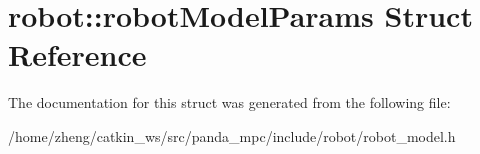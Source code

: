 \hypertarget{structrobot_1_1robot_model_params}{}\section{robot\+:\+:robot\+Model\+Params Struct Reference}
\label{structrobot_1_1robot_model_params}


The documentation for this struct was generated from the following file\+:\begin{DoxyCompactItemize}
\item 
/home/zheng/catkin\+\_\+ws/src/panda\+\_\+mpc/include/robot/robot\+\_\+model.\+h\end{DoxyCompactItemize}
